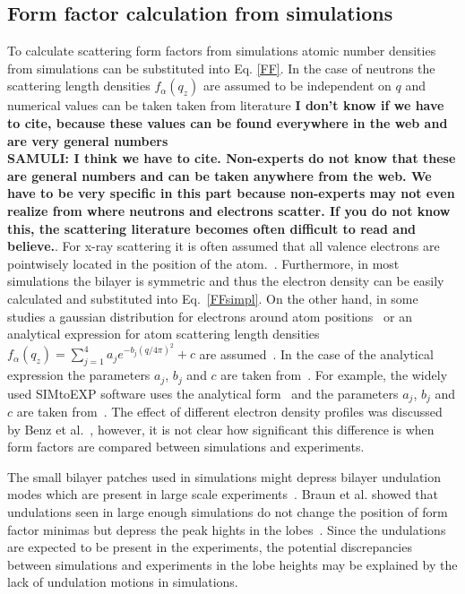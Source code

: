 \documentclass[aps,prl,superscriptaddress,twocolumn]{revtex4}
\begin{document}
\twocolumngrid

\subsection{Form factor calculation from simulations}
To calculate scattering form factors from simulations atomic number densities from
simulations can be substituted into Eq. \ref{FF}. In the case of neutrons the scattering 
length densities $f_\alpha(q_z)$ are assumed to be independent on $q$ and numerical values can be taken 
taken from literature 
{\bf I don't know if we have to cite, because these values can be found everywhere in the web and are very general numbers \\
SAMULI: I think we have to cite. Non-experts do not know that these are general numbers and can be taken anywhere from the web.
We have to be very specific in this part because non-experts may not even realize from where neutrons and electrons scatter.
If you do not know this, the scattering literature becomes often difficult to read and believe.}. 
For x-ray scattering it is often assumed that all valence electrons are pointwisely 
located in the position of the atom.~\cite{??}. Furthermore, in most simulations the bilayer is symmetric and
thus the electron density can be easily calculated and substituted into Eq.~\ref{FFsimpl}. 
On the other hand, in some studies a gaussian distribution for electrons around atom positions~\cite{benz05} 
or an analytical expression for atom scattering length densities $f_\alpha(q_z)=\sum_{j=1}^4a_je^{-b_j(q/4\pi)^2}+c$
are assumed~\cite{benz05,kucerka10,??}. In the case of the analytical expression the parameters 
$a_j$, $b_j$ and $c$ are taken from~\cite{??}. For example, the widely used SIMtoEXP software uses
the analytical form~\cite{kucerka10} and the parameters $a_j$, $b_j$ and $c$ are taken from~\cite{??}. The effect of different electron density profiles was discussed
by Benz et al.~\cite{benz05}, however, it is not clear how significant this difference is when form factors are
compared between simulations and experiments.

The small bilayer patches used in simulations might depress bilayer undulation modes which are present in large 
scale experiments~\cite{braun11}. Braun et al. showed that undulations seen in large enough simulations do
not change the position of form factor minimas but depress the peak hights in the lobes~\cite{braun11}.
Since the undulations are expected to be present in the experiments, the potential discrepancies 
between simulations and experiments in the lobe heights may be explained by the lack of undulation 
motions in simulations.
\end{document}
